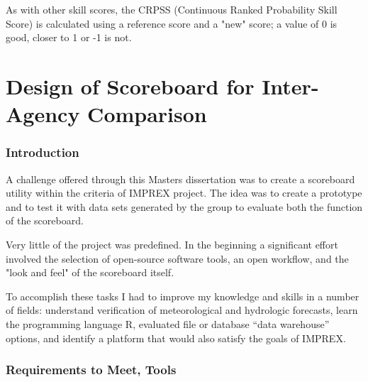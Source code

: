 \documentclass[logos,parttoc,morelanguage=french,morelanguage=german]{orsay-memoire}
\begin{document}
As with other skill scores, the CRPSS (Continuous Ranked Probability Skill Score) is calculated using a reference score and a "new" score; a value of 0 is good, closer to 1 or -1 is not.


\part{Design of Scoreboard for Inter-Agency Comparison}

\section{Introduction} 

A challenge offered through this Masters dissertation was to create a scoreboard utility within the criteria of IMPREX project. The idea was to create a prototype and to test it with data sets generated by the group to evaluate both the function of the scoreboard.

Very little of the project was predefined. In the beginning a significant effort involved the selection of open-source software tools, an open workflow, and the "look and feel" of the scoreboard itself.

To accomplish these tasks I had to improve my knowledge and skills in a number of fields: understand verification of meteorological and hydrologic forecasts, learn the programming language R, evaluated file or database ``data warehouse'' options, and identify a platform that would also satisfy the goals of IMPREX.

\section{Requirements to Meet, Tools}
\end{document}
